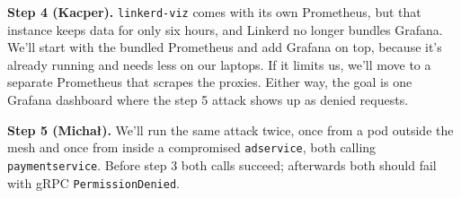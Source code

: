 \documentclass[12pt,a4paper]{article}
\begin{document}
\textbf{Step 4 (Kacper).} \texttt{linkerd-viz} comes with its own Prometheus,
but that instance keeps data for only six hours, and Linkerd no longer bundles
Grafana. We'll start with the bundled Prometheus and add Grafana on top,
because it's already running and needs less on our laptops. If it limits us,
we'll move to a separate Prometheus that scrapes the proxies. Either way, the
goal is one Grafana dashboard where the step 5 attack shows up as denied
requests.

\textbf{Step 5 (Michał).} We'll run the same attack twice, once from a pod
outside the mesh and once from inside a compromised \texttt{adservice}, both
calling \texttt{paymentservice}. Before step 3 both calls succeed; afterwards
both should fail with gRPC \texttt{PermissionDenied}.
\end{document}
